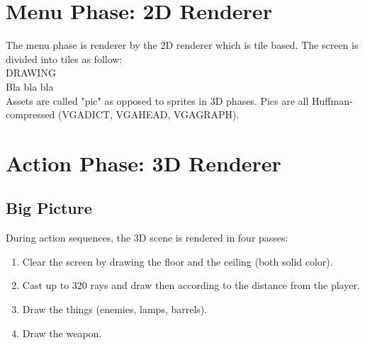 \documentclass[book.tex]{subfiles}
\begin{document}
\section{Menu Phase: 2D Renderer}
The menu phase is renderer by the 2D renderer which is tile based. The screen is divided into tiles as follow:\\
DRAWING\\
Bla bla bla\\
Assets are called "pic" as opposed to sprites in 3D phases. Pics  are all Huffman-compressed (VGADICT, VGAHEAD, 
VGAGRAPH).








\section{Action Phase: 3D Renderer}

\subsection{Big Picture}

During action sequences, the 3D scene is rendered in four passes:
\begin{enumerate}
 \item Clear the screen by drawing the floor and the ceiling (both solid color).
 \item Cast up to 320 rays and draw then according to the distance from the player.
 \item Draw the things (enemies, lamps, barrels).
 \item Draw the weapon.	
\end{enumerate}
\end{document}
